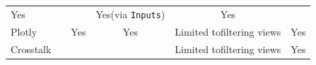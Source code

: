 \documentclass[]{book}
\theoremstyle{definition}
\theoremstyle{definition}
\theoremstyle{definition}
\theoremstyle{remark}
\begin{document}
\begin{longtable}[]{@{}lccccc@{}}
\begin{minipage}[t]{0.17\columnwidth}
Yes\strut
\end{minipage} & \begin{minipage}[t]{0.16\columnwidth}\centering\strut
\strut
\end{minipage} & \begin{minipage}[t]{0.10\columnwidth}\centering\strut
\strut
\end{minipage} & \begin{minipage}[t]{0.18\columnwidth}\centering\strut
Yes(via \texttt{Inputs})\strut
\end{minipage} & \begin{minipage}[t]{0.11\columnwidth}\centering\strut
Yes\strut
\end{minipage}\tabularnewline
\begin{minipage}[t]{0.11\columnwidth}\raggedright\strut
Plotly\strut
\end{minipage} & \begin{minipage}[t]{0.17\columnwidth}\centering\strut
\strut
\end{minipage} & \begin{minipage}[t]{0.16\columnwidth}\centering\strut
Yes\strut
\end{minipage} & \begin{minipage}[t]{0.10\columnwidth}\centering\strut
Yes\strut
\end{minipage} & \begin{minipage}[t]{0.18\columnwidth}\centering\strut
Limited tofiltering views\strut
\end{minipage} & \begin{minipage}[t]{0.11\columnwidth}\centering\strut
Yes\strut
\end{minipage}\tabularnewline
\begin{minipage}[t]{0.11\columnwidth}\raggedright\strut
Crosstalk\strut
\end{minipage} & \begin{minipage}[t]{0.17\columnwidth}\centering\strut
\strut
\end{minipage} & \begin{minipage}[t]{0.16\columnwidth}\centering\strut
\strut
\end{minipage} & \begin{minipage}[t]{0.10\columnwidth}\centering\strut
\strut
\end{minipage} & \begin{minipage}[t]{0.18\columnwidth}\centering\strut
Limited tofiltering views\strut
\end{minipage} & \begin{minipage}[t]{0.11\columnwidth}\centering\strut
Yes\strut
\end{minipage}\tabularnewline
\bottomrule
\end{longtable}
\end{document}
